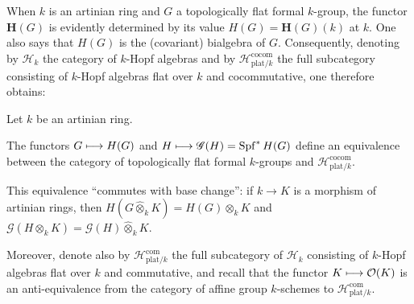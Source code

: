 When $k$ is an artinian ring and $G$ a topologically flat formal $k$-group, the functor $\mathbf H(G)$ is evidently determined by its value $H(G)=\mathbf H(G)(k)$ at $k$. One also says that $H(G)$ is the (covariant) bialgebra of $G$. Consequently, denoting by $\mathcal H_k$ the category of $k$-Hopf algebras and by $\mathcal H_{\mathrm{plat}/k}^{\mathrm{cocom}}$ the full subcategory consisting of $k$-Hopf algebras flat over $k$ and cocommutative, one therefore obtains:
\begin{corollary}{}
Let $k$ be an artinian ring.
\begin{enumeratei}
\item The functors $G\longmapsto H(G)$ and $H\longmapsto\mathscr G(H)=\operatorname{Spf}^*H(G)$ define an equivalence between the category of topologically flat formal $k$-groups and $\mathcal H_{\mathrm{plat}/k}^{\mathrm{cocom}}$.
\item This equivalence ``commutes with base change'': if $k\to K$ is a morphism of artinian rings, then $H(G\widehat\otimes_k K)=H(G)\otimes_k K$ and $\mathscr G(H\otimes_k K)=\mathscr G(H)\widehat\otimes_k K$.
\end{enumeratei}
\end{corollary}
Moreover, denote also by $\mathcal H_{\mathrm{plat}/k}^{\mathrm{com}}$ the full subcategory of $\mathcal H_k$ consisting of $k$-Hopf algebras flat over $k$ and commutative, and recall that the functor $K\longmapsto\mathcal{O}(K)$ is an anti-equivalence from the category of affine group $k$-schemes to $\mathcal H_{\mathrm{plat}/k}^{\mathrm{com}}$.

